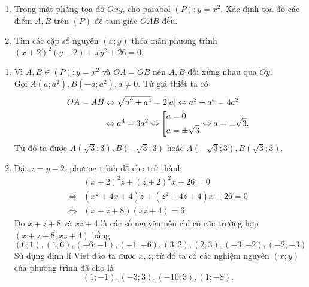 \begin{ex}%
\hfill
   \begin{enumerate}    
        \item Trong mặt phẳng tọa độ $Oxy$, cho parabol $(P):y=x^2$. Xác định tọa độ các điểm $A,B$ trên $(P)$ để tam giác $OAB$ đều.
        \item Tìm các cặp số nguyên $(x;y)$ thỏa mãn phương trình $(x+2)^2(y-2)	+xy^2+26=0.$
    \end{enumerate}
\loigiai
    {\begin{enumerate}
    \item Vì $A,B \in (P):y=x^2$ và $OA=OB$ nên $A,B$ đối xứng nhau qua $Oy$.\\
    Gọi $A\left(a;a^2\right), B\left(-a;a^2\right), a \ne 0$. Từ giả thiết ta có 
    {\allowdisplaybreaks
    \begin{align*}
    OA=AB & \Leftrightarrow \sqrt{a^2+a^4}=2|a|\Leftrightarrow a^2 + a^4 = 4a^2\\
    	& \Leftrightarrow a^4=3a^2 \Leftrightarrow \left[\begin{aligned}& a=0 \\ & a = \pm \sqrt{3}\end{aligned}\right. \Leftrightarrow a= \pm \sqrt{3}.
    \end{align*}}
    Từ đó ta được $A\left(\sqrt{3};3\right),B\left(-\sqrt{3};3\right) $ hoặc $A\left(-\sqrt{3};3\right),B\left(\sqrt{3};3\right)$.
    \item Đặt $z=y-2$, phương trình đã cho trở thành
    {\allowdisplaybreaks
    \begin{align*}
    				& (x+2)^2z+(z+2)^2x+26=0\\
    \Leftrightarrow & (x^2+4x+4)z+(z^2+4z+4)x+26=0\\
    \Leftrightarrow & (x+z+8)(xz+4)=6
    \end{align*}}
    Do $x+z+8$ và $xz+4$ là các số nguyên nên chỉ có các trường hợp $(x+z+8;xz+4)$ bằng 
   				$$(6;1), (1;6), (-6;-1), (-1;-6), (3;2), (2;3), (-3;-2), (-2;-3)$$
    Sử dụng định lí Viet đảo ta đươc $x,z$, từ đó ta có các nghiệm nguyên $(x;y)$ của phương trình đã cho là
   			 	$$(1;-1), (-3;3), (-10;3), (1;-8).$$
    \end{enumerate}
    }
\end{ex}

